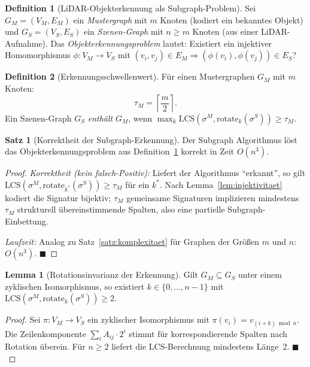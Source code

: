 ﻿\documentclass[a4paper,12pt]{article}
\theoremstyle{definition}
\newtheorem{definition}{Definition}[section]
\newtheorem{satz}{Satz}[section]
\newtheorem{lemma}{Lemma}[section]
\begin{document}
\begin{definition}[LiDAR-Objekterkennung als Subgraph-Problem]
  \label{def:erkennung}
  Sei $G_M = (V_M, E_M)$ ein \emph{Mustergraph} mit $m$ Knoten
  (kodiert ein bekanntes Objekt) und $G_S = (V_S, E_S)$ ein
  \emph{Szenen-Graph} mit $n \geq m$ Knoten (aus einer LiDAR-Aufnahme).
  Das \emph{Objekterkennungsproblem} lautet: Existiert ein injektiver
  Homomorphismus $\phi: V_M \to V_S$ mit
  $(v_i, v_j) \in E_M \Rightarrow (\phi(v_i), \phi(v_j)) \in E_S$?
\end{definition}

\begin{definition}[Erkennungsschwellenwert]
  \label{def:schwellenwert}
  Für einen Mustergraphen $G_M$ mit $m$ Knoten:
  \[
    \tau_M = \left\lceil \frac{m}{2} \right\rceil.
  \]
  Ein Szenen-Graph $G_S$ \emph{enthält} $G_M$, wenn
  $\max_k \mathrm{LCS}(\sigma^M, \mathrm{rotate}_k(\sigma^S))
  \geq \tau_M$.
\end{definition}

\begin{satz}[Korrektheit der Subgraph-Erkennung]
  \label{satz:erkennung_korrektheit}
  Der Subgraph Algorithmus löst das Objekterkennungsproblem aus
  Definition~\ref{def:erkennung} korrekt in Zeit $O(n^3)$.
\end{satz}

\begin{proof}
  \emph{Korrektheit (kein falsch-Positiv):} Liefert der Algorithmus
  ``erkannt'', so gilt $\mathrm{LCS}(\sigma^M, \mathrm{rotate}_{k^*}
  (\sigma^S)) \geq \tau_M$ für ein $k^*$. Nach
  Lemma~\ref{lem:injektivitaet} kodiert die Signatur bijektiv;
  $\tau_M$ gemeinsame Signaturen implizieren mindestens $\tau_M$
  strukturell übereinstimmende Spalten, also eine partielle
  Subgraph-Einbettung.

  \emph{Laufzeit:} Analog zu Satz~\ref{satz:komplexitaet} für
  Graphen der Größen $m$ und $n$: $O(n^3)$. \hfill$\blacksquare$
\end{proof}

\begin{lemma}[Rotationsinvarianz der Erkennung]
  \label{lem:rotinvariant}
  Gilt $G_M \subseteq G_S$ unter einem zyklischen Isomorphismus,
  so existiert $k \in \{0,\ldots,n-1\}$ mit
  $\mathrm{LCS}(\sigma^M, \mathrm{rotate}_k(\sigma^S)) \geq 2$.
\end{lemma}

\begin{proof}
  Sei $\pi: V_M \to V_S$ ein zyklischer Isomorphismus mit
  $\pi(v_i) = v_{(i+k) \bmod n}$. Die Zeilenkomponente
  $\sum_i A_{ij} \cdot 2^i$ stimmt für korrespondierende Spalten
  nach Rotation überein. Für $n \geq 2$ liefert die LCS-Berechnung
  mindestens Länge~2. \hfill$\blacksquare$
\end{proof}
\end{document}
